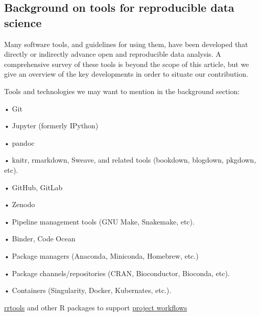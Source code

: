 \documentclass[9pt,a4paper]{extarticle}
\begin{document}
\subsection*{Background on tools for reproducible data science}

Many software tools, and guidelines for using them, have been developed
that directly or indirectly advance open and reproducible data analysis.
A comprehensive survey of these tools is beyond the scope of this
article, but we give an overview of the key developments in order to
situate our contribution.

Tools and technologies we may want to mention in the background section:

• Git

• Jupyter (formerly IPython)

• pandoc

• knitr, rmarkdown, Sweave, and related tools (bookdown, blogdown,
pkgdown, etc).

• GitHub, GitLab

• Zenodo

• Pipeline management tools (GNU Make, Snakemake, etc).

• Binder, Code Ocean

• Package managers (Anaconda, Miniconda, Homebrew, etc.)

• Package channels/repositories (CRAN, Bioconductor, Bioconda, etc).

• Containers (Singularity, Docker, Kubernates, etc.).

\href{https://github.com/benmarwick/rrtools}{rrtools} and other R
packages to support
\href{https://github.com/jdblischak/ctv-project-workflows/blob/master/ProjectWorkflows.md}{project
workflows}
\end{document}
